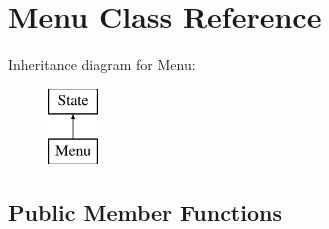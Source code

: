 \hypertarget{classMenu}{
\section{\-Menu \-Class \-Reference}
\label{d8/ddb/classMenu}
}
\-Inheritance diagram for \-Menu\-:\begin{figure}[H]
\begin{center}
\leavevmode
\includegraphics[height=2.000000cm]{d8/ddb/classMenu}
\end{center}
\end{figure}
\subsection*{\-Public \-Member \-Functions}
